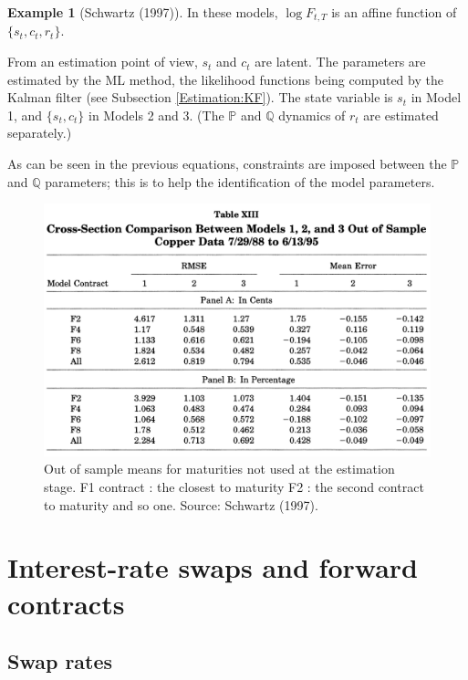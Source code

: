 \documentclass[
  12pt,
]{book}
\theoremstyle{definition}
\theoremstyle{definition}
\newtheorem{example}{Example}[chapter]
\theoremstyle{definition}
\theoremstyle{definition}
\theoremstyle{remark}
\begin{document}
\begin{example}[Schwartz (1997)]
In these models, \(\log F_{t,T}\) is an affine function of \(\{s_t, c_t, r_t\}\).

From an estimation point of view, \(s_t\) and \(c_t\) are latent. The parameters are estimated by the ML method, the likelihood functions being computed by the Kalman filter (see Subsection \ref{Estimation:KF}). The state variable is \(s_t\) in Model 1, and \(\{s_t, c_t\}\) in Models 2 and 3. (The \(\mathbb{P}\) and \(\mathbb{Q}\) dynamics of \(r_t\) are estimated separately.)

As can be seen in the previous equations, constraints are imposed between the \(\mathbb{P}\) and \(\mathbb{Q}\) parameters; this is to help the identification of the model parameters.

\begin{figure}

{\centering \includegraphics[width=0.95\linewidth]{figures/Tab2_Schwartz} 

}

\caption{Out of sample means for maturities not used at the  estimation stage. F1 contract : the closest to maturity F2 : the second contract to maturity and so one. Source: Schwartz (1997).}\label{fig:Schwartz2}
\end{figure}

\end{example}

\hypertarget{interest-rate-swaps-and-forward-contracts}{%
\section{Interest-rate swaps and forward contracts}\label{interest-rate-swaps-and-forward-contracts}}

\hypertarget{Swaps}{%
\subsection{Swap rates}\label{Swaps}}
\end{document}
